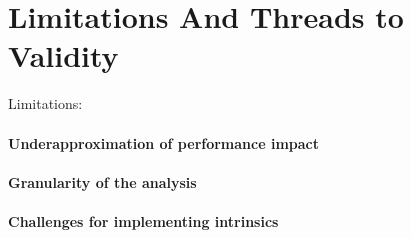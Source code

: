 \section{Limitations And Threads to Validity}

Limitations:

\paragraph{Underapproximation of performance impact}
\paragraph{Granularity of the analysis}
\paragraph{Challenges for implementing intrinsics}

